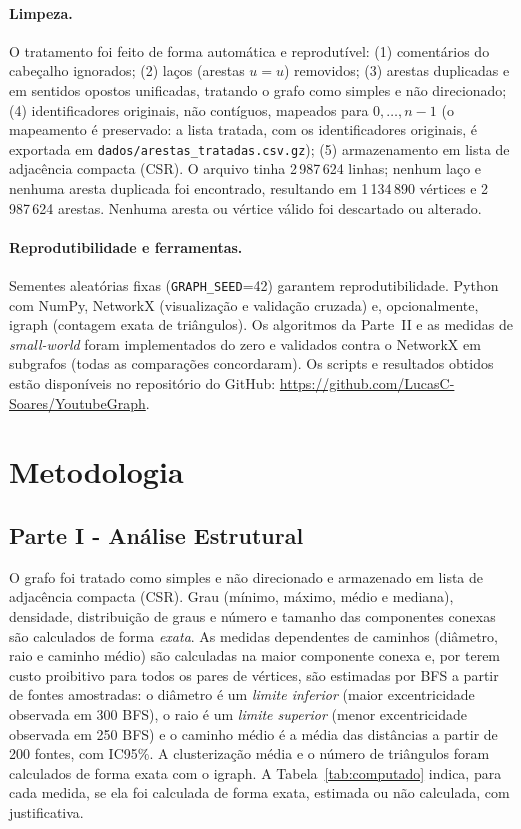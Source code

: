 \documentclass[sigconf]{webmedia}
\begin{document}
\paragraph{Limpeza.} O tratamento foi feito de forma automática e reprodutível: (1) comentários do cabeçalho ignorados; (2) laços (arestas $u=u$) removidos; (3) arestas duplicadas e em sentidos opostos unificadas, tratando o grafo como simples e não direcionado; (4) identificadores originais, não contíguos, mapeados para $0,\dots,n-1$ (o mapeamento é preservado: a lista tratada, com os identificadores originais, é exportada em \texttt{dados/arestas\_tratadas.csv.gz}); (5) armazenamento em lista de adjacência compacta (CSR). O arquivo tinha 2\,987\,624 linhas; nenhum laço e nenhuma aresta duplicada foi encontrado, resultando em 1\,134\,890 vértices e 2\,987\,624 arestas. Nenhuma aresta ou vértice válido foi descartado ou alterado.

\paragraph{Reprodutibilidade e ferramentas.} Sementes aleatórias fixas (\texttt{GRAPH\_}\allowbreak\texttt{SEED}=42) garantem reprodutibilidade. Python com NumPy, NetworkX \cite{hagberg2008} (visualização e validação cruzada) e, opcionalmente, igraph \cite{igraph} (contagem exata de triângulos). Os algoritmos da Parte~II e as medidas de \emph{small-world} foram implementados do zero e validados contra o NetworkX em subgrafos (todas as comparações concordaram). 
Os scripts e resultados obtidos estão disponíveis no repositório
do GitHub:
\url{https://github.com/LucasC-Soares/YoutubeGraph}.

\section{Metodologia}
\label{sec:metodologia}

\subsection{Parte I - Análise Estrutural}
O grafo foi tratado como simples e não direcionado e armazenado em lista de adjacência compacta (CSR). Grau (mínimo, máximo, médio e mediana), densidade, distribuição de graus e número e tamanho das componentes conexas são calculados de forma \emph{exata}. As medidas dependentes de caminhos (diâmetro, raio e caminho médio) são calculadas na maior componente conexa e, por terem custo proibitivo para todos os pares de vértices, são estimadas por BFS a partir de fontes amostradas: o diâmetro é um \emph{limite inferior} (maior excentricidade observada em 300 BFS), o raio é um \emph{limite superior} (menor excentricidade observada em 250 BFS) e o caminho médio é a média das distâncias a partir de 200 fontes, com IC95\%. A clusterização média e o número de triângulos foram calculados de forma exata com o igraph. A Tabela~\ref{tab:computado} indica, para cada medida, se ela foi calculada de forma exata, estimada ou não calculada, com justificativa.
\end{document}
